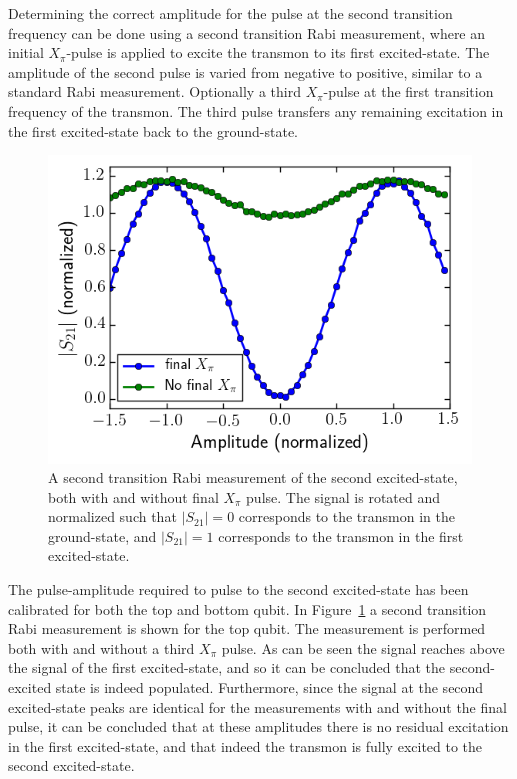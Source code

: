         Determining the correct amplitude for the pulse at the second transition frequency can be done using a second transition Rabi measurement, where an initial $X_\pi$-pulse is applied to excite the transmon to its first excited-state. The amplitude of the second pulse is varied from negative to positive, similar to a standard Rabi measurement. Optionally a third $X_\pi$-pulse at the first transition frequency of the transmon. The third pulse transfers any remaining excitation in the first excited-state back to the ground-state.

        \begin{figure}
          \begin{center}
          \vspace{-30pt}
            \includegraphics[width=\textwidth]{../Figures/Qubit characterization/Rabi12.png}
          \end{center}
          \vspace{-20 pt}
          \caption{A second transition Rabi measurement of the second excited-state, both with and without final $X_\pi$ pulse. The signal is rotated and normalized such that $\left|S_{21}\right|=0$ corresponds to the transmon in the ground-state, and $\left|S_{21}\right|=1$ corresponds to the transmon in the first excited-state.}
          \label{fig:Rabi12}
        \end{figure}

        The pulse-amplitude required to pulse to the second excited-state has been calibrated for both the top and bottom qubit. In Figure~\ref{fig:Rabi12} a second transition Rabi measurement is shown for the top qubit. The measurement is performed both with and without a third $X_\pi$ pulse. As can be seen the signal reaches above the signal of the first excited-state, and so it can be concluded that the second-excited state is indeed populated. Furthermore, since the signal at the second excited-state peaks are identical for the measurements with and without the final pulse, it can be concluded that at these amplitudes there is no residual excitation in the first excited-state, and that indeed the transmon is fully excited to the second excited-state.


